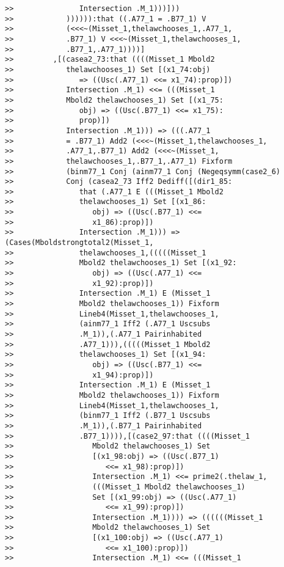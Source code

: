 \documentclass[12pt]{article}
\begin{document}
\begin{verbatim}
>>               Intersection .M_1)))]))
>>            )))))):that ((.A77_1 = .B77_1) V
>>            (<<<~(Misset_1,thelawchooses_1,.A77_1,
>>            .B77_1) V <<<~(Misset_1,thelawchooses_1,
>>            .B77_1,.A77_1))))]
>>         ,[(casea2_73:that ((((Misset_1 Mbold2
>>            thelawchooses_1) Set [(x1_74:obj)
>>               => ((Usc(.A77_1) <<= x1_74):prop)])
>>            Intersection .M_1) <<= (((Misset_1
>>            Mbold2 thelawchooses_1) Set [(x1_75:
>>               obj) => ((Usc(.B77_1) <<= x1_75):
>>               prop)])
>>            Intersection .M_1))) => (((.A77_1
>>            = .B77_1) Add2 (<<<~(Misset_1,thelawchooses_1,
>>            .A77_1,.B77_1) Add2 (<<<~(Misset_1,
>>            thelawchooses_1,.B77_1,.A77_1) Fixform
>>            (binm77_1 Conj (ainm77_1 Conj (Negeqsymm(case2_6)
>>            Conj (casea2_73 Iff2 Dediff([(dir1_85:
>>               that (.A77_1 E (((Misset_1 Mbold2
>>               thelawchooses_1) Set [(x1_86:
>>                  obj) => ((Usc(.B77_1) <<=
>>                  x1_86):prop)])
>>               Intersection .M_1))) => (Cases(Mboldstrongtotal2(Misset_1,
>>               thelawchooses_1,(((((Misset_1
>>               Mbold2 thelawchooses_1) Set [(x1_92:
>>                  obj) => ((Usc(.A77_1) <<=
>>                  x1_92):prop)])
>>               Intersection .M_1) E (Misset_1
>>               Mbold2 thelawchooses_1)) Fixform
>>               Lineb4(Misset_1,thelawchooses_1,
>>               (ainm77_1 Iff2 (.A77_1 Uscsubs
>>               .M_1)),(.A77_1 Pairinhabited
>>               .A77_1))),(((((Misset_1 Mbold2
>>               thelawchooses_1) Set [(x1_94:
>>                  obj) => ((Usc(.B77_1) <<=
>>                  x1_94):prop)])
>>               Intersection .M_1) E (Misset_1
>>               Mbold2 thelawchooses_1)) Fixform
>>               Lineb4(Misset_1,thelawchooses_1,
>>               (binm77_1 Iff2 (.B77_1 Uscsubs
>>               .M_1)),(.B77_1 Pairinhabited
>>               .B77_1)))),[(case2_97:that ((((Misset_1
>>                  Mbold2 thelawchooses_1) Set
>>                  [(x1_98:obj) => ((Usc(.B77_1)
>>                     <<= x1_98):prop)])
>>                  Intersection .M_1) <<= prime2(.thelaw_1,
>>                  (((Misset_1 Mbold2 thelawchooses_1)
>>                  Set [(x1_99:obj) => ((Usc(.A77_1)
>>                     <<= x1_99):prop)])
>>                  Intersection .M_1)))) => ((((((Misset_1
>>                  Mbold2 thelawchooses_1) Set
>>                  [(x1_100:obj) => ((Usc(.A77_1)
>>                     <<= x1_100):prop)])
>>                  Intersection .M_1) <<= (((Misset_1

\end{verbatim}
\end{document}
